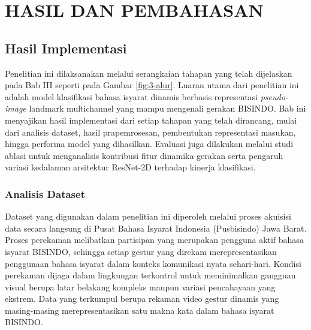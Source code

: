 \chapter{HASIL DAN PEMBAHASAN}
\label{chap:bab4}


\section{Hasil Implementasi}
\label{sec:hasil-implementasi}
Penelitian ini dilaksanakan melalui serangkaian tahapan yang telah dijelaskan pada Bab III seperti pada Gambar \ref{fig:3-alur}. 
Luaran utama dari penelitian ini adalah model klasifikasi bahasa isyarat dinamis berbasis representasi \textit{pseudo-image} landmark multichannel yang mampu mengenali gerakan BISINDO.  
Bab ini menyajikan hasil implementasi dari setiap tahapan yang telah dirancang, mulai dari analisis dataset, hasil prapemrosesan, pembentukan representasi masukan, hingga performa model yang dihasilkan.  
Evaluasi juga dilakukan melalui studi ablasi untuk menganalisis kontribusi fitur dinamika gerakan serta pengaruh variasi kedalaman arsitektur ResNet-2D terhadap kinerja klasifikasi.  

\subsection{Analisis Dataset}
\label{subsec:analisis-dataset}

Dataset yang digunakan dalam penelitian ini diperoleh melalui proses akuisisi data secara 
langsung di Pusat Bahasa Isyarat Indonesia (Pusbisindo) Jawa Barat. 
Proses perekaman melibatkan partisipan yang merupakan pengguna aktif bahasa isyarat BISINDO, 
sehingga setiap gestur yang direkam merepresentasikan penggunaan bahasa isyarat dalam konteks 
komunikasi nyata sehari-hari. 
Kondisi perekaman dijaga dalam lingkungan terkontrol untuk meminimalkan gangguan visual berupa 
latar belakang kompleks maupun variasi pencahayaan yang ekstrem. 
Data yang terkumpul berupa rekaman video gestur dinamis yang masing-masing merepresentasikan 
satu makna kata dalam bahasa isyarat BISINDO.


